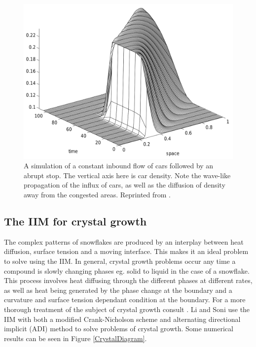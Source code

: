 \begin{figure}[h]
    \centering
    \includegraphics{diagrams/TrafficDiagram.png}
    \caption{A simulation of a constant inbound flow of cars followed by an abrupt stop. The vertical axis here is car density. Note the wave-like propagation of the influx of cars, as well as the diffusion of density away from the congested areas. Reprinted from \cite{wiegmannbube98}.}
    \label{TrafficDiagram}
\end{figure}

\newpage

\subsection{The IIM for crystal growth}
The complex patterns of snowflakes are produced by an interplay between heat diffusion, surface tension and a moving interface.
This makes it an ideal problem to solve using the IIM.
In general, crystal growth problems occur any time a compound is slowly changing phases eg. solid to liquid in the case of a snowflake.
This process involves heat diffusing through the different phases at different rates, as well as heat being generated by the phase change at the boundary and a curvature and surface tension dependant condition at the boundary.
For a more thorough treatment of the subject of crystal growth consult \cite{langer80}.
Li and Soni \cite{lisoni99} use the IIM with both a modified Crank-Nicholson scheme and alternating directional implicit (ADI) method to solve problems of crystal growth.
Some numerical results can be seen in Figure \ref{CrystalDiagram}.

